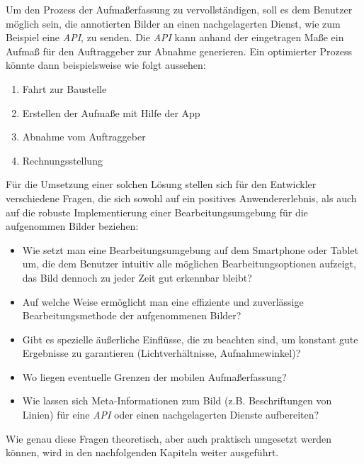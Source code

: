 Um den Prozess der Aufmaßerfassung zu vervollständigen, soll es dem Benutzer möglich sein, die annotierten Bilder an einen nachgelagerten Dienst, wie zum Beispiel eine \emph{API}, zu senden.
Die \emph{API} kann anhand der eingetragen Maße ein Aufmaß für den Auftraggeber zur Abnahme generieren.
Ein optimierter Prozess könnte dann beispielsweise wie folgt aussehen:
\begin{enumerate}
  \item Fahrt zur Baustelle
  \item Erstellen der Aufmaße mit Hilfe der App
  \item Abnahme vom Auftraggeber
  \item Rechnungsstellung
\end{enumerate} 

\noindent
Für die Umsetzung einer solchen Lösung stellen sich für den Entwickler verschiedene Fragen, die sich sowohl auf ein positives Anwendererlebnis, als auch auf die robuste Implementierung einer Bearbeitungsumgebung für die aufgenommen Bilder beziehen:

\begin{itemize}
  \item Wie setzt man eine Bearbeitungsumgebung auf dem Smartphone oder Tablet um, die dem Benutzer intuitiv alle möglichen Bearbeitungsoptionen aufzeigt, das Bild dennoch zu jeder Zeit gut erkennbar bleibt?
  \item Auf welche Weise ermöglicht man eine effiziente und zuverlässige Bearbeitungsmethode der aufgenommenen Bilder?
  \item Gibt es spezielle äußerliche Einflüsse, die zu beachten sind, um konstant gute Ergebnisse zu garantieren (Lichtverhältnisse, Aufnahmewinkel)?
  \item Wo liegen eventuelle Grenzen der mobilen Aufmaßerfassung?
  \item Wie lassen sich Meta-Informationen zum Bild (z.B. Beschriftungen von Linien) für eine \emph{API} oder einen nachgelagerten Dienste aufbereiten?
\end{itemize}

\noindent
Wie genau diese Fragen theoretisch, aber auch praktisch umgesetzt werden können, wird in den nachfolgenden Kapiteln weiter ausgeführt.

